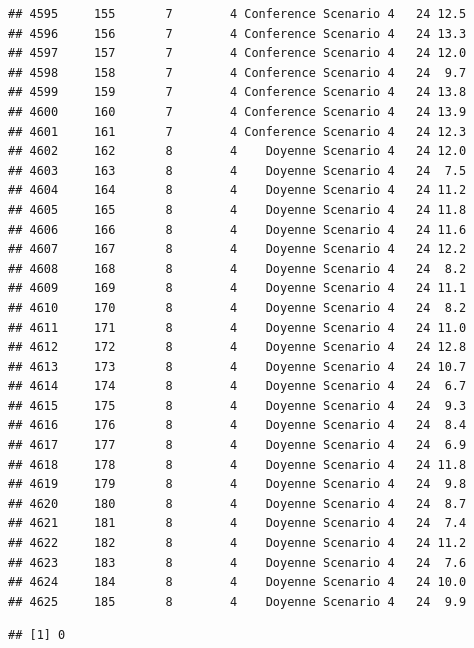 \documentclass[
]{article}
\newenvironment{Shaded}{\begin{snugshade}}{\end{snugshade}}
\newcommand{\DecValTok}[1]{\textcolor[rgb]{0.00,0.00,0.81}{#1}}
\newcommand{\FunctionTok}[1]{\textcolor[rgb]{0.13,0.29,0.53}{\textbf{#1}}}
\newcommand{\NormalTok}[1]{#1}
\newcommand{\SpecialCharTok}[1]{\textcolor[rgb]{0.81,0.36,0.00}{\textbf{#1}}}
\begin{document}
\begin{verbatim}
## 4595     155       7        4 Conference Scenario 4   24 12.5
## 4596     156       7        4 Conference Scenario 4   24 13.3
## 4597     157       7        4 Conference Scenario 4   24 12.0
## 4598     158       7        4 Conference Scenario 4   24  9.7
## 4599     159       7        4 Conference Scenario 4   24 13.8
## 4600     160       7        4 Conference Scenario 4   24 13.9
## 4601     161       7        4 Conference Scenario 4   24 12.3
## 4602     162       8        4    Doyenne Scenario 4   24 12.0
## 4603     163       8        4    Doyenne Scenario 4   24  7.5
## 4604     164       8        4    Doyenne Scenario 4   24 11.2
## 4605     165       8        4    Doyenne Scenario 4   24 11.8
## 4606     166       8        4    Doyenne Scenario 4   24 11.6
## 4607     167       8        4    Doyenne Scenario 4   24 12.2
## 4608     168       8        4    Doyenne Scenario 4   24  8.2
## 4609     169       8        4    Doyenne Scenario 4   24 11.1
## 4610     170       8        4    Doyenne Scenario 4   24  8.2
## 4611     171       8        4    Doyenne Scenario 4   24 11.0
## 4612     172       8        4    Doyenne Scenario 4   24 12.8
## 4613     173       8        4    Doyenne Scenario 4   24 10.7
## 4614     174       8        4    Doyenne Scenario 4   24  6.7
## 4615     175       8        4    Doyenne Scenario 4   24  9.3
## 4616     176       8        4    Doyenne Scenario 4   24  8.4
## 4617     177       8        4    Doyenne Scenario 4   24  6.9
## 4618     178       8        4    Doyenne Scenario 4   24 11.8
## 4619     179       8        4    Doyenne Scenario 4   24  9.8
## 4620     180       8        4    Doyenne Scenario 4   24  8.7
## 4621     181       8        4    Doyenne Scenario 4   24  7.4
## 4622     182       8        4    Doyenne Scenario 4   24 11.2
## 4623     183       8        4    Doyenne Scenario 4   24  7.6
## 4624     184       8        4    Doyenne Scenario 4   24 10.0
## 4625     185       8        4    Doyenne Scenario 4   24  9.9
\end{verbatim}

\begin{Shaded}
\end{Shaded}

\begin{verbatim}
## [1] 0
\end{verbatim}
\end{document}

